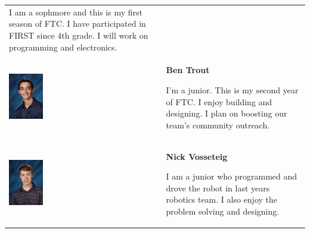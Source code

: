 \begin{tabular}{p{2cm}b{8cm}}
 \medskip 

 I am a sophmore and this is my first season of FTC. I have participated in FIRST since 4th grade. I will work on programming and electronics.\\
 
 \includegraphics[height=2cm,keepaspectratio=true]{./TeamSection/TroutBen.jpg}&

 \textbf{Ben Trout}
 
 \medskip
 
 I'm a junior. This is my second year of FTC. I enjoy building and designing. I plan on boosting our team's community outreach. \\
 
 \includegraphics[height=2cm,keepaspectratio=true]{./TeamSection/VosseteigNick.jpg}&

 \textbf{Nick Vosseteig}
 
 \medskip
 
 I am a junior who programmed and drove the robot in last years robotics team. I also enjoy the problem solving and designing.\\
\end{tabular} 